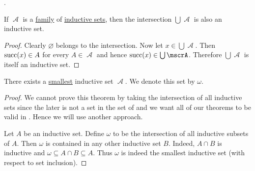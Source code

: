 \begin{proposition}\label{thm:zfc_existence_theorems}
  .
\end{proposition}

\begin{proposition}\label{thm:intersection_of_inductive_sets}
  If \( \mscrA \) is a \hyperref[rem:family_of_sets]{family} of \hyperref[def:inductive_set]{inductive sets}, then the intersection \( \bigcup \mscrA \) is also an inductive set.
\end{proposition}
\begin{proof}
  Clearly \( \varnothing \) belongs to the intersection. Now let \( x \in \bigcup \mscrA \). Then \( \operatorname{succ}(x) \in A \) for every \( A \in \mscrA \) and hence \( \op{succ}(x) \in \bigcup \mscrA \). Therefore \( \bigcup \mscrA \) is itself an inductive set.
\end{proof}

\begin{proposition}\label{thm:smallest_inductive_set_existence}
  There exists a \hyperref[def:poset_extremal_points/maximum_and_minimum]{smallest} inductive set \( \mscrA \). We denote this set by \( \omega \).
\end{proposition}
\begin{proof}
  We cannot prove this theorem by taking the intersection of all inductive sets since the later is not a set in the set of  and we want all of our theorems to be valid in . Hence we will use another approach.

  Let \( A \) be an inductive set. Define \( \omega \) to be the intersection of all inductive subsets of \( A \). Then \( \omega \) is contained in any other inductive set \( B \). Indeed, \( A \cap B \) is inductive and \( \omega \subseteq A \cap B \subseteq A \). Thus \( \omega \) is indeed the smallest inductive set (with respect to set inclusion).
\end{proof}

